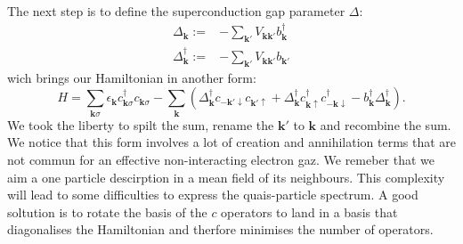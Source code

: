 \documentclass[../main.tex]{subfile}
\begin{document}
The next step is to define the superconduction gap parameter $\Delta$:
\begin{align}
    \Delta_{\bm{k}} := &-\sum_{\bm{k}'} V_{\bm{k}\bm{k}'} b_{\bm{k}}^{\dagger}\\
    \Delta^{\dagger}_{\bm{k}} := &-\sum_{\bm{k}'} V_{\bm{k}\bm{k}'} b_{\bm{k}'}\label{eq:DeltaBaseDef}
\end{align}
wich brings our Hamiltonian in another form:
\begin{equation} \label{eq:HamiltonianBCS1}
    H = \sum_{\bm{k}\sigma} \epsilon_{\bm{k}} c_{\bm{k}\sigma}^{\dagger}c_{\bm{k}\sigma} - \sum_{\bm{k}} \left( \Delta_{\bm{k}}^{\dagger} c_{-\bm{k}'\downarrow}c_{\bm{k}'\uparrow}  + \Delta_{\bm{k}}^{\dagger} c_{\bm{k}\uparrow} ^{\dagger}c_{-\bm{k}\downarrow}^{\dagger} -  b_{\bm{k}}^{\dagger} \Delta_{\bm{k}}^{\dagger} \right).
\end{equation}
We took the liberty to spilt the sum, rename the $\bm{k}'$ to $\bm{k}$ and recombine the sum. We notice that this form involves a lot of creation and annihilation terms that 
are not commun for an effective non-interacting electron gaz. We remeber that we aim a one particle descirption in a mean field of its neighbours.
This complexity will lead to some difficulties to express the quais-particle spectrum. A good soltution is 
to rotate the basis of the $c$ operators to land in a basis that diagonalises the Hamiltonian and therfore minimises the number of operators.\\
\end{document}
